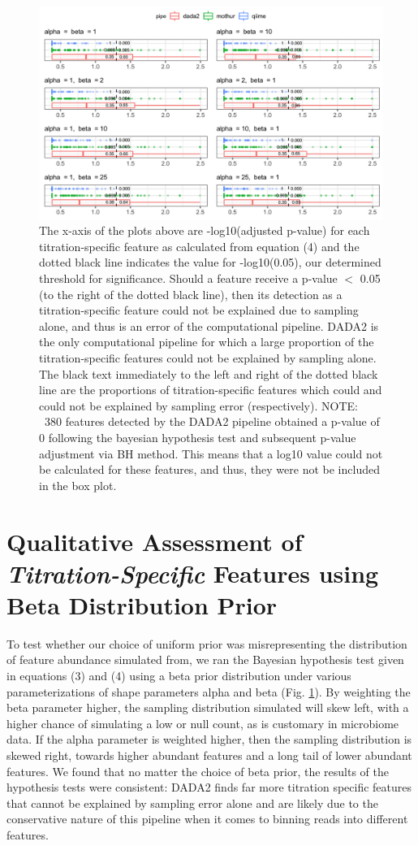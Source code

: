 \documentclass[12pt]{article}
\begin{document}
\clearpage

\begin{figure}
\centering
\includegraphics[width=0.9\linewidth]{bayes_beta.png}
\caption{\label{fig:bayesPrior} The x-axis of the plots above are -log10(adjusted p-value) for each titration-specific feature as calculated from equation (4) and the dotted black line indicates the value for -log10(0.05), our determined threshold for significance. Should a feature receive a p-value $<$ 0.05 (to the right of the dotted black line), then its detection as a titration-specific feature could not be explained due to sampling alone, and thus is an error of the computational pipeline. DADA2 is the only computational pipeline for which a large proportion of the titration-specific features could not be explained by sampling alone. The black text immediately to the left and right of the dotted black line are the proportions of titration-specific features which could and could not be explained by sampling error (respectively). NOTE: ~380 features detected by the DADA2 pipeline obtained a p-value of 0 following the bayesian hypothesis test and subsequent p-value adjustment via BH method. This means that a log10 value could not be calculated for these features, and thus, they were not be included in the box plot.}
\end{figure}

\section*{Qualitative Assessment of \emph{Titration-Specific} Features using Beta Distribution Prior}
To test whether our choice of uniform prior was misrepresenting the distribution of feature abundance simulated from, we ran the Bayesian hypothesis test given in equations (3) and (4) using a beta prior distribution under various parameterizations of shape parameters alpha and beta (Fig. \ref{fig:bayesPrior}). By weighting the beta parameter higher, the sampling distribution simulated will skew left, with a higher chance of simulating a low or null count, as is customary in microbiome data. If the alpha parameter is weighted higher, then the sampling distribution is skewed right, towards higher abundant features and a long tail of lower abundant features. We found that no matter the choice of beta prior, the results of the hypothesis tests were consistent: DADA2 finds far more titration specific features that cannot be explained by sampling error alone and are likely due to the conservative nature of this pipeline when it comes to binning reads into different features.
\end{document}
